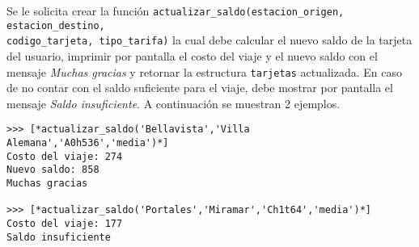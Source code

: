 Se le solicita crear la función \texttt{actualizar\_saldo(estacion\_origen, estacion\_destino, \\
codigo\_tarjeta, tipo\_tarifa)} la cual debe calcular el nuevo saldo de la tarjeta del usuario, imprimir por pantalla el costo del viaje y el nuevo saldo con el mensaje \textit{Muchas gracias} y retornar la estructura \texttt{tarjetas} actualizada. En caso de no contar con el saldo suficiente para el viaje, debe mostrar por pantalla el mensaje \textit{Saldo insuficiente}. A continuación se muestran 2 ejemplos.

\begin{lstlisting}[style=consola]
>>> [*actualizar_saldo('Bellavista','Villa Alemana','A0h536','media')*]
Costo del viaje: 274
Nuevo saldo: 858
Muchas gracias

>>> [*actualizar_saldo('Portales','Miramar','Ch1t64','media')*]
Costo del viaje: 177
Saldo insuficiente
\end{lstlisting}
